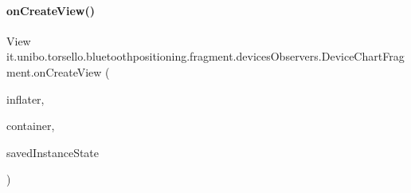 \hypertarget{classit_1_1unibo_1_1torsello_1_1bluetoothpositioning_1_1fragment_1_1devicesObservers_1_1DeviceChartFragment_aa9ea67b08976eaaa04d7fa197a8fe562_aa9ea67b08976eaaa04d7fa197a8fe562}{}\label{classit_1_1unibo_1_1torsello_1_1bluetoothpositioning_1_1fragment_1_1devicesObservers_1_1DeviceChartFragment_aa9ea67b08976eaaa04d7fa197a8fe562_aa9ea67b08976eaaa04d7fa197a8fe562} 
\paragraph{\texorpdfstring{on\+Create\+View()}{onCreateView()}}
{\footnotesize\ttfamily View it.\+unibo.\+torsello.\+bluetoothpositioning.\+fragment.\+devices\+Observers.\+Device\+Chart\+Fragment.\+on\+Create\+View (\begin{DoxyParamCaption}\item[{Layout\+Inflater}]{inflater,  }\item[{View\+Group}]{container,  }\item[{Bundle}]{saved\+Instance\+State }\end{DoxyParamCaption})}


